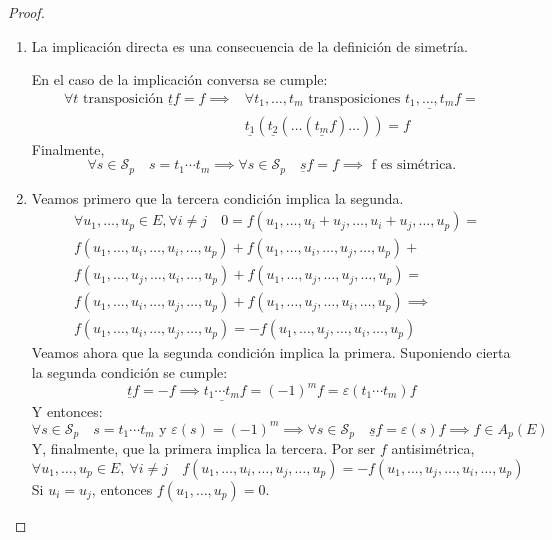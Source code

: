 \begin{proof}
    \begin{enumerate}
        \item La implicación directa es una consecuencia de la definición de simetría.

        En el caso de la implicación conversa se cumple:
        \[
        \begin{split} \forall t \text{ transposición } \underline{t}f = f \implies & \forall
        t_1,\dots ,t_m \text{ transposiciones } \underline{t_1,\dots,t_m} f =\\
        &\underline{t_1}(\underline{t_2}(\dots (\underline{t_m}f)\dots)) = f
        \end{split}
        \]
        Finalmente,
        \[\forall s \in \mathcal{S}_p \quad s = t_1 \cdots t_m \implies \forall s \in
        \mathcal{S}_p \quad \underline{s}f = f \implies \text{ f es simétrica.}\]

        \item Veamos primero que la tercera condición implica la segunda.
        \[\begin{split}
        &\forall u_1,\dots,u_p \in E, \forall i \neq j \quad
        0 = f(u_1,\dots,u_i+u_j,\dots,u_i+u_j, \dots, u_p) =\\
        &f(u_1,\dots,u_i,\dots,u_i,\dots,u_p)+
        f(u_1,\dots,u_i,\dots,u_j,\dots,u_p)+\\
        &f(u_1,\dots,u_j,\dots,u_i,\dots,u_p)+
        f(u_1,\dots,u_j,\dots,u_j,\dots,u_p)=\\
        &f(u_1,\dots,u_i,\dots,u_j,\dots,u_p)+
        f(u_1,\dots,u_j,\dots,u_i,\dots,u_p)\implies\\
        &f(u_1,\dots,u_i,\dots,u_j,\dots,u_p) =
        -f(u_1,\dots,u_j,\dots,u_i,\dots,u_p)
        \end{split}\]
        Veamos ahora que la segunda condición implica la primera. Suponiendo cierta
        la segunda condición se cumple:
        \[\underline{t}f = -f \implies \underline{t_1\cdots t_m}f = (-1)^mf =
        \varepsilon(t_1\cdots t_m)f\]
        Y entonces:
        \[\forall s \in \mathcal{S}_p \quad s = t_1\cdots t_m \text{ y } \varepsilon(s) = (-1)^m
        \implies \forall s\in \mathcal{S}_p \quad \underline{s}f = \varepsilon(s)f
        \implies f \in A_p(E)\]
        Y, finalmente, que la primera implica la tercera. Por ser $f$ antisimétrica,
        \[
        \forall u_1,\dots,u_p \in E, \ \forall i \neq j \quad
        f(u_1,\dots, u_i, \dots, u_j, \dots, u_p) = -f(u_1,\dots, u_j, \dots, u_i, \dots, u_p)
        \]
        Si $u_i = u_j$, entonces $f(u_1, \dots, u_p) = 0$.

    \end{enumerate}
\end{proof}
